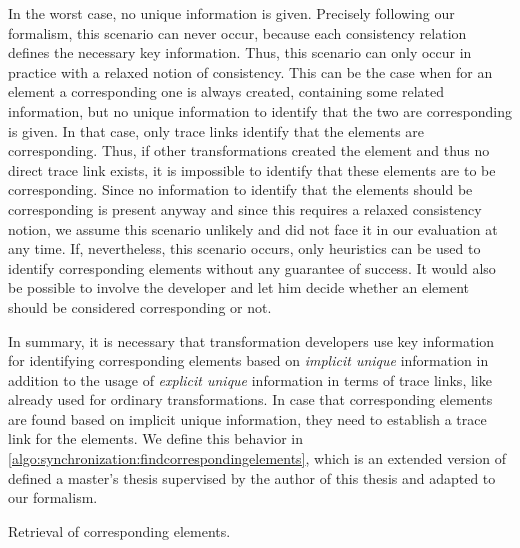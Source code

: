 In the worst case, no unique information is given.
Precisely following our formalism, this scenario can never occur, because each consistency relation defines the necessary key information.
Thus, this scenario can only occur in practice with a relaxed notion of consistency.
This can be the case when for an element a corresponding one is always created, containing some related information, but no unique information to identify that the two are corresponding is given.
In that case, only trace links identify that the elements are corresponding.
Thus, if other transformations created the element and thus no direct trace link exists, it is impossible to identify that these elements are to be corresponding.
Since no information to identify that the elements should be corresponding is present anyway and since this requires a relaxed consistency notion, we assume this scenario unlikely and did not face it in our evaluation at any time.
If, nevertheless, this scenario occurs, only heuristics can be used to identify corresponding elements without any guarantee of success.
It would also be possible to involve the developer and let him decide whether an element should be considered corresponding or not.

In summary, it is necessary that transformation developers use key information for identifying corresponding elements based on \emph{implicit unique} information in addition to the usage of \emph{explicit unique} information in terms of trace links, like already used for ordinary transformations.
In case that corresponding elements are found based on implicit unique information, they need to establish a trace link for the elements.
We define this behavior in \autoref{algo:synchronization:findcorrespondingelements}, which is an extended version of \cite[Algorithm 1]{saglam2020ma} defined a master's thesis supervised by the author of this thesis and adapted to our formalism.

\begin{algorithm}
    
    \caption[Retrieval of corresponding elements]{Retrieval of corresponding elements.}
    \label{algo:synchronization:findcorrespondingelements}
\end{algorithm}

